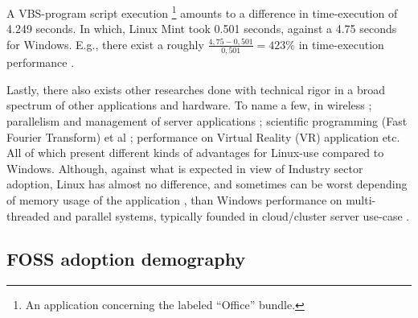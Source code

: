 \documentclass[
12pt,				%
openright,			%
oneside,			%
a4paper,			%
brazil,				%
english,			%
]{abntex2}
\begin{document}
A VBS-program script execution \footnote{An application concerning the
  labeled ``Office'' bundle.} amounts to a difference in
time-execution of 4.249 seconds. In which, Linux
Mint took 0.501 seconds, against a 4.75 seconds for Windows. E.g.,
there exist a roughly $\frac{4,75-0,501}{0,501}= 423\%$ in
time-execution performance \cite{sulaiman2021comparison}.

Lastly, there also exists other researches done with technical rigor in a
broad spectrum of other applications and hardware. To name a few, in
wireless \cite{SDevan2013WINDOWS8V}; parallelism and management of
server applications \cite{aveleda2010performance}; scientific programming (Fast Fourier Transform) et al
\cite{d2011performance}; performance on Virtual Reality (VR)
application \cite{thubaasini2010efficient} etc. All of which present
different kinds of advantages for Linux-use compared to
Windows. Although, against what is expected in view of Industry sector
adoption, Linux has almost no difference, and sometimes can be worst
depending of memory usage of the application \cite{ristov2013}, than Windows performance on
multi-threaded and parallel systems, typically founded in cloud/cluster
server use-case \cite{aveleda2010performance}.


\subsection{FOSS adoption demography}
\end{document}
